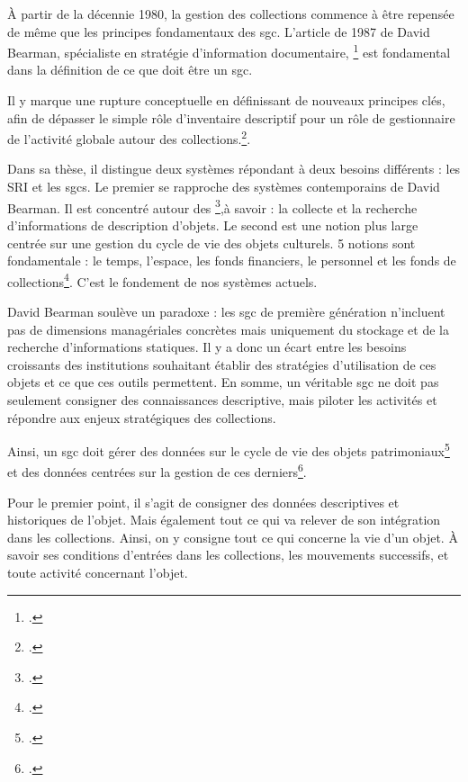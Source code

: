 À partir de la décennie 1980, la gestion des collections commence à être repensée de même que les principes fondamentaux des \gls{sgc}. L'article de 1987 de David Bearman, spécialiste en stratégie d'information documentaire, \footcite{ArchivesMuseumInformatics} est fondamental dans la définition de ce que doit être un \gls{sgc}. 

Il y marque une rupture conceptuelle en définissant de nouveaux principes clés, afin de dépasser le simple rôle d'inventaire descriptif pour un rôle de  gestionnaire de l'activité globale autour des collections.\footcite[p.1]{ArchivesMuseumInformatics}.

Dans sa thèse, il distingue deux systèmes répondant à deux besoins différents : les \gls{SRI} et les \glspl{sgc}. Le premier se rapproche des systèmes contemporains de David Bearman. Il est concentré autour des \footcite[p.2]{ArchivesMuseumInformatics},à savoir : la collecte et la recherche d'informations de description d'objets. Le second est une notion plus large centrée sur une gestion du cycle de vie des objets culturels. 5 notions sont fondamentale : le temps, l'espace, les fonds financiers, le personnel et les fonds de collections\footcite[p.3]{ArchivesMuseumInformatics}. C'est le fondement de nos systèmes actuels.

David Bearman soulève un paradoxe : les \gls{sgc} de première génération n'incluent pas de dimensions managériales concrètes mais uniquement du stockage et de la recherche d'informations statiques. Il y a donc un écart entre les besoins croissants des institutions souhaitant établir des stratégies d'utilisation de ces objets et ce que ces outils permettent. En somme, un véritable \gls{sgc} ne doit pas seulement consigner des connaissances descriptive, mais piloter les activités et répondre aux enjeux stratégiques des collections.\newline

Ainsi, un \gls{sgc} doit gérer des données sur le cycle de vie des objets patrimoniaux\footcite[p.4-11]{ArchivesMuseumInformatics} et des données centrées sur la gestion de ces derniers\footcite[p.12-22]{ArchivesMuseumInformatics}.

Pour le premier point, il s'agit de consigner des données descriptives et historiques de l'objet. Mais également tout ce qui va relever de son intégration dans les collections. Ainsi, on y consigne tout ce qui concerne la vie d'un objet. À savoir ses conditions d'entrées dans les collections, les mouvements successifs, et toute activité concernant l'objet.

